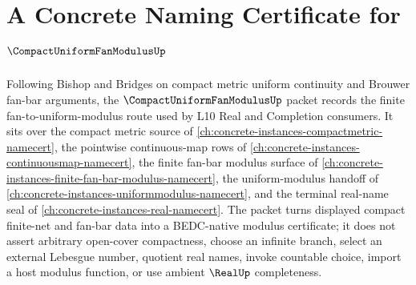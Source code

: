 \chapter{A Concrete Naming Certificate for $\CompactUniformFanModulusUp$}
\label{ch:concrete-instances-compact-uniform-fan-modulus-namecert}

Following Bishop and Bridges on compact metric uniform continuity and Brouwer fan-bar arguments, the $\CompactUniformFanModulusUp$ packet records the finite fan-to-uniform-modulus route used by L10 Real and Completion consumers. It sits over the compact metric source of \autoref{ch:concrete-instances-compactmetric-namecert}, the pointwise continuous-map rows of \autoref{ch:concrete-instances-continuousmap-namecert}, the finite fan-bar modulus surface of \autoref{ch:concrete-instances-finite-fan-bar-modulus-namecert}, the uniform-modulus handoff of \autoref{ch:concrete-instances-uniformmodulus-namecert}, and the terminal real-name seal of \autoref{ch:concrete-instances-real-namecert}. The packet turns displayed compact finite-net and fan-bar data into a BEDC-native modulus certificate; it does not assert arbitrary open-cover compactness, choose an infinite branch, select an external Lebesgue number, quotient real names, invoke countable choice, import a host modulus function, or use ambient $\RealUp$ completeness.

